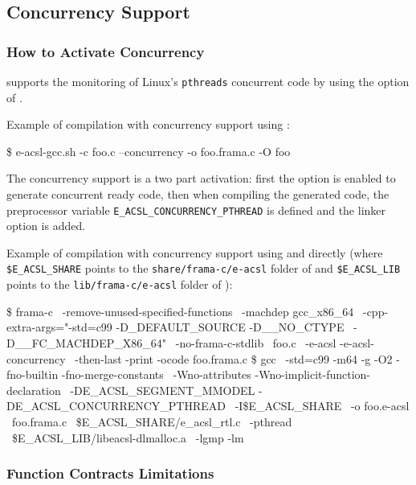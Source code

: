 \subsection{Concurrency Support}\label{sec:eacsl-gcc:concurrency}

\subsubsection{How to Activate Concurrency}

\eacsl supports the monitoring of Linux's \texttt{pthreads} concurrent code by
using the option  of  \eacslgcc.

Example of compilation with concurrency support using \eacslgcc:
\begin{shell}
  \$ e-acsl-gcc.sh -c foo.c --concurrency -o foo.frama.c -O foo
\end{shell}

The concurrency support is a two part activation: first the
 \framac option is enabled to generate concurrent
ready code, then when compiling the generated code, the preprocessor variable
\texttt{E\_ACSL\_CONCURRENCY\_PTHREAD} is defined and the linker option
 is added.

Example of compilation with concurrency support using \framac and \gcc directly
(where \texttt{\$E\_ACSL\_SHARE} points to the \texttt{share/frama-c/e-acsl}
folder of \framac and \texttt{\$E\_ACSL\_LIB} points to the
\texttt{lib/frama-c/e-acsl} folder of \framac):
\begin{shell}
  \$ frama-c \
        -remove-unused-specified-functions \
        -machdep gcc_x86_64 \
        -cpp-extra-args="-std=c99 -D_DEFAULT_SOURCE -D__NO_CTYPE \
                         -D__FC_MACHDEP_X86_64" \
        -no-frama-c-stdlib \
        foo.c \
        -e-acsl -e-acsl-concurrency \
        -then-last -print -ocode foo.frama.c
  \$ gcc \
        -std=c99 -m64 -g -O2 -fno-builtin -fno-merge-constants \
        -Wno-attributes -Wno-implicit-function-declaration \
        -DE_ACSL_SEGMENT_MMODEL -DE_ACSL_CONCURRENCY_PTHREAD \
        -I\$E_ACSL_SHARE \
        -o foo.e-acsl \
        foo.frama.c \
        \$E_ACSL_SHARE/e_acsl_rtl.c \
        -pthread \
        \$E_ACSL_LIB/libeacsl-dlmalloc.a \
        -lgmp -lm
\end{shell}

\subsubsection{Function Contracts Limitations}

